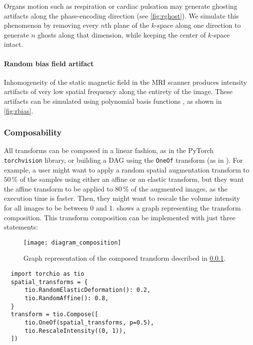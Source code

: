 Organs motion such as respiration or cardiac pulsation may generate ghosting artifacts along the phase-encoding direction \cite{zhuo_mr_2006} (see \cref{fig:rghost}).
We simulate this phenomenon by removing every $n$th plane of the $k$-space along one direction to generate $n$ ghosts along that dimension, while keeping the center of $k$-space intact.


\paragraph{Random bias field artifact}

Inhomogeneity of the static magnetic field in the \ac{MRI} scanner produces intensity artifacts of very low spatial frequency along the entirety of the image.
These artifacts can be simulated using polynomial basis functions \cite{van_leemput_automated_1999}, as shown in \cref{fig:rbias}.



\subsubsection{Composability}
\label{sec:composability}

All transforms can be composed in a linear fashion, as in the PyTorch \texttt{torchvision} library, or building a \ac{DAG} using the \texttt{OneOf} transform (as in \cite{buslaev_albumentations_2020}).
For example, a user might want to apply a random spatial augmentation transform to $50\,\%$ of the samples using either an affine or an elastic transform, but they want the affine transform to be applied to $80\,\%$ of the augmented images, as the execution time is faster.
Then, they might want to rescale the volume intensity for all images to be between 0 and 1.
 shows a graph representing the transform composition.
This transform composition can be implemented with just three statements:

\begin{figure}
  \centering
  \texttt{[image: diagram\_composition]}
  \caption[Graph representation of a composed transform]{
    Graph representation of the composed transform described in \cref{sec:composability}.
  }
  \label{fig:dag}
\end{figure}

\begin{verbatim}
  import torchio as tio
  spatial_transforms = {
      tio.RandomElasticDeformation(): 0.2,
      tio.RandomAffine(): 0.8,
  }
  transform = tio.Compose([
      tio.OneOf(spatial_transforms, p=0.5),
      tio.RescaleIntensity((0, 1)),
  ])
\end{verbatim}


